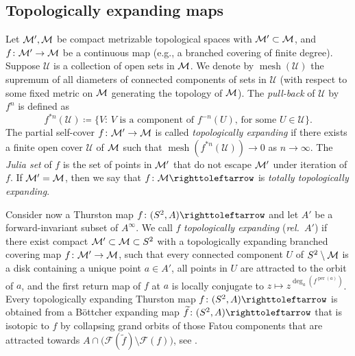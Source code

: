 \documentclass{amsart}
\theoremstyle{plain}
\theoremstyle{definition}
\theoremstyle{remark}
\newcommand{\per}{{\operatorname{per}}}
\newcommand{\Fat}{{\mathcal F}}
\newcommand{\UU}{{\mathcal U}}
\newcommand\selfmap{\righttoleftarrow}
\newcommand{\mesh}{{\operatorname{mesh}}}
\begin{document}
\subsection{Topologically expanding maps} \label{subsec:top_exp}
Let ${\mathcal M}',{\mathcal M}$ be compact metrizable topological spaces with ${\mathcal M}'\subset{\mathcal M}$, and $f\colon {\mathcal M}'\to {\mathcal M}$ be a continuous map (e.g., a branched covering of finite degree). %
Suppose $\UU$ is a collection of open sets in ${\mathcal M}$. We denote by $\mesh(\UU)$ the supremum of all diameters of connected components of sets in $\UU$ (with respect to some fixed metric on ${\mathcal M}$ generating the topology of ${\mathcal M}$).  The \emph{pull-back} of $\UU$ by $f^n$ is defined as 
\[f^{*n}(\UU)\coloneq \{\text{$V$: $V$ is a component of $f^{-n}(U)$,  for some $U\in \UU$}\}.\]
The partial self-cover  $f\colon {\mathcal M}'\to {\mathcal M}$  is called \emph{topologically expanding} if there exists a finite open cover $\UU$ of ${\mathcal M}$ such that $\mesh(f^{*n}(\UU))\to 0$ as $n\to \infty$. The \emph{Julia set} of $f$ is the set of points in ${\mathcal M}'$ that do not escape ${\mathcal M}'$ under iteration of $f$. %
If ${\mathcal M}'={\mathcal M}$, then we say that $f\colon \MM\selfmap$ is \emph{totally topologically expanding}.


Consider now a Thurston map $f\colon (S^2,A)\selfmap$ and let $A'$ be a forward-invariant subset of $A^\infty$. We call $f$ \emph{topologically expanding} (\emph{rel.\ $A'$}) if there exist compact ${\mathcal M}'\subset {\mathcal M}\subset S^2$  with a topologically expanding branched covering map $f \colon {\mathcal M}'\to {\mathcal M}$, such that every connected component $U$ of $S^2\setminus {\mathcal M}$ is a disk containing a unique point $a\in A'$, all points in $U$ are attracted to the orbit of $a$, and the first return map of $f$ at $a$ is locally conjugate to $z\mapsto z^{\deg_a(f^{\per(a)})}$. Every topologically expanding Thurston map $f\colon (S^2,A)\selfmap$ is obtained from a B\"ottcher expanding map $\widetilde{f}\colon (S^2,A)\selfmap$ that is isotopic to $f$ by collapsing grand orbits of those Fatou components that are attracted towards $A\cap \big(\Fat(\widetilde{f}) \setminus \Fat(f)\big)$, see \cite[Theorem A and Proposition 1.1]{BD_Exp}. %
\end{document}
